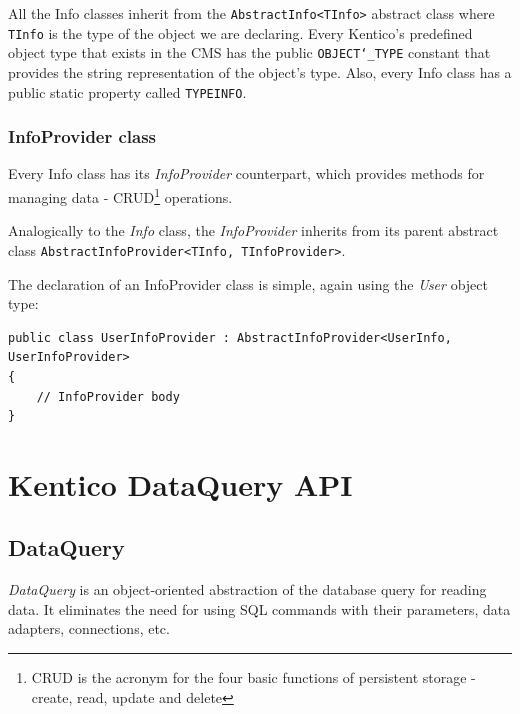 \documentclass[
  print,
  table,
  nolof,
  nolot,
  nocover,
  oneside
]{fithesis3}
\begin{document}
All the Info classes inherit from the \texttt{AbstractInfo<TInfo>} abstract class where \texttt{TInfo} is the type of the object we are declaring. Every Kentico's predefined object type that exists in the CMS has the public \mbox{\texttt{OBJECT\char`_TYPE}} constant that provides the string representation of the object's type. Also, every Info class has a public static property called \texttt{TYPEINFO}.


\subsection{InfoProvider class}
\label{infoprovider class}

Every Info class has its \textit{InfoProvider} counterpart, which provides methods for managing data - CRUD\footnote{CRUD is the acronym for the four basic functions of persistent storage - create, read, update and delete} operations.

Analogically to the \textit{Info} class, the \textit{InfoProvider} inherits from its parent abstract class \texttt{AbstractInfoProvider<TInfo, TInfoProvider>}.

The declaration of an InfoProvider class is simple, again using the \textit{User} object type:
\begin{lstlisting}
public class UserInfoProvider : AbstractInfoProvider<UserInfo, UserInfoProvider>
{
    // InfoProvider body
}
\end{lstlisting}



\chapter{Kentico DataQuery API}
\label{data query}


\section{DataQuery}
\label{DataQuery}

\textit{DataQuery} is an object-oriented abstraction of the database query for reading data. It eliminates the need for using SQL commands with their parameters, data adapters, connections, etc.
\end{document}
